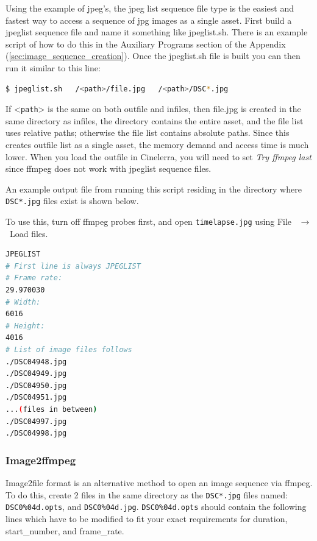 Using the example of jpeg’s, the jpeg list sequence file type is the easiest and fastest way to access a sequence of jpg images as a single asset.  First build a jpeglist sequence file and name it something like jpeglist.sh.  There is an example script of how to do this in the Auxiliary Programs section of the Appendix (\ref{sec:image_sequence_creation}).  Once the jpeglist.sh file is built you can then run it similar to this line:

\begin{lstlisting}[language=bash,numbers=none]
$ jpeglist.sh   /<path>/file.jpg   /<path>/DSC*.jpg
\end{lstlisting}

\vspace*{1ex} \noindent If <\texttt{path}> is the same on both outfile and infiles, then file.jpg is created in the same directory as infiles, the directory contains the entire asset, and the file list uses relative paths; otherwise the file list contains absolute paths.   Since this creates outfile list as a single asset, the memory demand and access time is much lower.  When you load the outfile in Cinelerra, you will need to set \textit{Try ffmpeg last} since ffmpeg does not work with jpeglist sequence files.

An example output file from running this script residing in the directory where \texttt{DSC*.jpg} files exist is shown below.

To use this, turn off ffmpeg probes first, and open \texttt{timelapse.jpg} using File ~$\rightarrow$ ~Load files.

\begin{lstlisting}[language=bash,numbers=none,caption={Example: timelapse.jpg},captionpos=t]
JPEGLIST
# First line is always JPEGLIST
# Frame rate:
29.970030
# Width:
6016
# Height:
4016
# List of image files follows
./DSC04948.jpg
./DSC04949.jpg
./DSC04950.jpg
./DSC04951.jpg
...(files in between)
./DSC04997.jpg
./DSC04998.jpg
\end{lstlisting}

\subsubsection{Image2ffmpeg}%
\label{ssub:image2ffmpeg}

Image2file format is an alternative method to open an image sequence via ffmpeg.  To do this, create 2 files in the same directory as the \texttt{DSC*.jpg} files named:  \texttt{DSC0\%04d.opts}, and \texttt{DSC0\%04d.jpg}. 
\texttt{DSC0\%04d.opts} should contain the following lines which have to be modified to fit your exact requirements for duration, start\_number, and frame\_rate.


